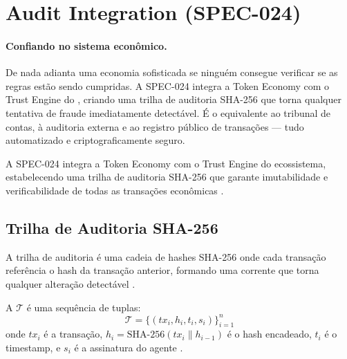 \section{Audit Integration (SPEC-024)}
\label{sec:audit-integration}
\nivelintermediario

\paragraph{Confiando no sistema econômico.} De nada adianta uma economia sofisticada se ninguém consegue verificar se as regras estão sendo cumpridas. A SPEC-024 integra a Token Economy com o Trust Engine do \opencodeeco{}, criando uma trilha de auditoria SHA-256 que torna qualquer tentativa de fraude imediatamente detectável. É o equivalente ao tribunal de contas, à auditoria externa e ao registro público de transações --- tudo automatizado e criptograficamente seguro.

A SPEC-024 integra a Token Economy com o Trust Engine do
ecossistema, estabelecendo uma trilha de auditoria SHA-256 que
garante imutabilidade e verificabilidade de todas as transações
econômicas \cite{opencode2026token}.

\subsection{Trilha de Auditoria SHA-256}

A trilha de auditoria é uma cadeia de hashes SHA-256 onde cada
transação referência o hash da transação anterior, formando uma
corrente que torna qualquer alteração detectável
\cite{opencode2026token, nakamoto2008bitcoin}.

\begin{definicao}
A  $\mathcal{T}$ é uma sequência
de tuplas:
\[
\mathcal{T} = \{(tx_i, h_i, t_i, s_i)\}_{i=1}^n
\]
onde $tx_i$ é a transação, $h_i = \text{SHA-256}(tx_i \| h_{i-1})$
é o hash encadeado, $t_i$ é o timestamp, e $s_i$ é a assinatura
do agente \cite{opencode2026token}.
\end{definicao}

